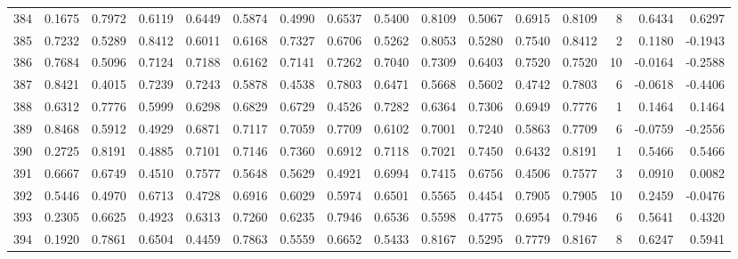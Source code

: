 \begin{tabular}{lrrrrrrrrrrrrrrr}
384 &      0.1675 &  0.7972 &  0.6119 &  0.6449 &  0.5874 &  0.4990 &  0.6537 &  0.5400 &  0.8109 &  0.5067 &   0.6915 &     0.8109 &      8 &                    0.6434 &                     0.6297 \\
385 &      0.7232 &  0.5289 &  0.8412 &  0.6011 &  0.6168 &  0.7327 &  0.6706 &  0.5262 &  0.8053 &  0.5280 &   0.7540 &     0.8412 &      2 &                    0.1180 &                    -0.1943 \\
386 &      0.7684 &  0.5096 &  0.7124 &  0.7188 &  0.6162 &  0.7141 &  0.7262 &  0.7040 &  0.7309 &  0.6403 &   0.7520 &     0.7520 &     10 &                   -0.0164 &                    -0.2588 \\
387 &      0.8421 &  0.4015 &  0.7239 &  0.7243 &  0.5878 &  0.4538 &  0.7803 &  0.6471 &  0.5668 &  0.5602 &   0.4742 &     0.7803 &      6 &                   -0.0618 &                    -0.4406 \\
388 &      0.6312 &  0.7776 &  0.5999 &  0.6298 &  0.6829 &  0.6729 &  0.4526 &  0.7282 &  0.6364 &  0.7306 &   0.6949 &     0.7776 &      1 &                    0.1464 &                     0.1464 \\
389 &      0.8468 &  0.5912 &  0.4929 &  0.6871 &  0.7117 &  0.7059 &  0.7709 &  0.6102 &  0.7001 &  0.7240 &   0.5863 &     0.7709 &      6 &                   -0.0759 &                    -0.2556 \\
390 &      0.2725 &  0.8191 &  0.4885 &  0.7101 &  0.7146 &  0.7360 &  0.6912 &  0.7118 &  0.7021 &  0.7450 &   0.6432 &     0.8191 &      1 &                    0.5466 &                     0.5466 \\
391 &      0.6667 &  0.6749 &  0.4510 &  0.7577 &  0.5648 &  0.5629 &  0.4921 &  0.6994 &  0.7415 &  0.6756 &   0.4506 &     0.7577 &      3 &                    0.0910 &                     0.0082 \\
392 &      0.5446 &  0.4970 &  0.6713 &  0.4728 &  0.6916 &  0.6029 &  0.5974 &  0.6501 &  0.5565 &  0.4454 &   0.7905 &     0.7905 &     10 &                    0.2459 &                    -0.0476 \\
393 &      0.2305 &  0.6625 &  0.4923 &  0.6313 &  0.7260 &  0.6235 &  0.7946 &  0.6536 &  0.5598 &  0.4775 &   0.6954 &     0.7946 &      6 &                    0.5641 &                     0.4320 \\
394 &      0.1920 &  0.7861 &  0.6504 &  0.4459 &  0.7863 &  0.5559 &  0.6652 &  0.5433 &  0.8167 &  0.5295 &   0.7779 &     0.8167 &      8 &                    0.6247 &                     0.5941 \\

\end{tabular}
